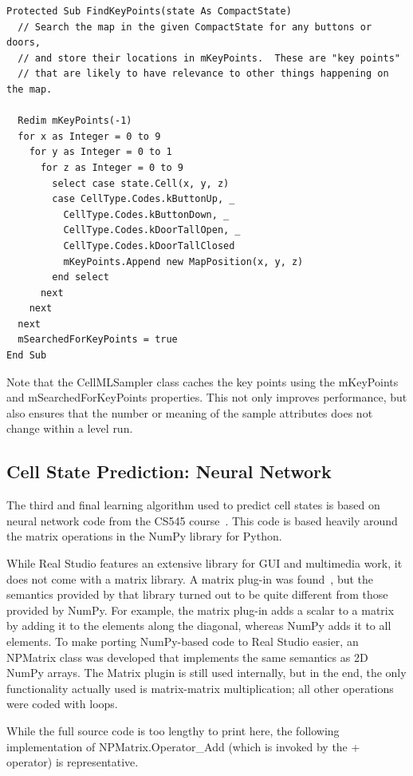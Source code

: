 \documentclass{article}
\begin{document}
\begin{lstlisting}
Protected Sub FindKeyPoints(state As CompactState)
  // Search the map in the given CompactState for any buttons or doors,
  // and store their locations in mKeyPoints.  These are "key points"
  // that are likely to have relevance to other things happening on the map.
  
  Redim mKeyPoints(-1)
  for x as Integer = 0 to 9
    for y as Integer = 0 to 1
      for z as Integer = 0 to 9
        select case state.Cell(x, y, z)
        case CellType.Codes.kButtonUp, _
          CellType.Codes.kButtonDown, _
          CellType.Codes.kDoorTallOpen, _
          CellType.Codes.kDoorTallClosed
          mKeyPoints.Append new MapPosition(x, y, z)
        end select
      next
    next
  next
  mSearchedForKeyPoints = true  
End Sub
\end{lstlisting}

Note that the CellMLSampler class caches the key points using the mKeyPoints and mSearchedForKeyPoints properties.  This not only improves performance, but also ensures that the number or meaning of the sample attributes does not change within a level run.

\subsection{Cell State Prediction: Neural Network}

The third and final learning algorithm used to predict cell states is based on neural network code from the CS545 course~\cite{CHUCKSCG}.  This code is based heavily around the matrix operations in the NumPy library for Python.

While Real Studio features an extensive library for GUI and multimedia work, it does not come with a matrix library.  A matrix plug-in was found~\cite{MATRIXPLUGIN}, but the semantics provided by that library turned out to be quite different from those provided by NumPy.  For example, the matrix plug-in adds a scalar to a matrix by adding it to the elements along the diagonal, whereas NumPy adds it to all elements.  To make porting NumPy-based code to Real Studio easier, an NPMatrix class was developed that implements the same semantics as 2D NumPy arrays.  The Matrix plugin is still used internally, but in the end, the only functionality actually used is matrix-matrix multiplication; all other operations were coded with loops.

While the full source code is too lengthy to print here, the following implementation of NPMatrix.Operator\_Add (which is invoked by the + operator) is representative.
\end{document}
